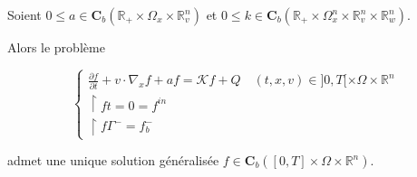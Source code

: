 \documentclass[onecolumn, 12pt, a4paper]{article}
\begin{document}
Soient $0 \leq a \in \mathbf{C}_b(\mathbb{R}_+ \times \Omega_x \times \mathbb{R}_v^n)$ et $0 \leq k \in \mathbf{C}_b(\mathbb{R}_+ \times \Omega_x^n \times \mathbb{R}_v^n \times \mathbb{R}_w^n)$.

Alors le problème 

\[
\begin{cases}
\frac{\partial f}{\partial t}+v \cdot \nabla_x f +af =   \mathcal{K} f +Q \quad (t,x,v) \in ]0,T[ \times \Omega \times \mathbb{R}^n\\
\restriction{f}{t=0}= f^{in}\\
\restriction{f}{\Gamma^-}=f_b^-
\end{cases}
\]

admet une unique solution généralisée $f \in \mathbf{C}_b([0,T] \times \Omega \times \mathbb{R}^n)$.
\end{document}

